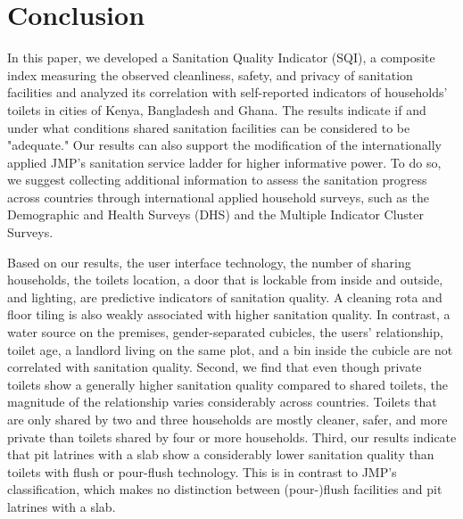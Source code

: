 \documentclass[natbib]{svjour3}                     %
\begin{document}
\FloatBarrier

\section{Conclusion}
\label{sec:conclusion}
In this paper, we developed a Sanitation Quality Indicator (SQI), a composite index measuring the observed cleanliness, safety, and privacy of sanitation facilities and analyzed its correlation with self-reported indicators of households’ toilets in cities of Kenya, Bangladesh and Ghana. The results indicate if and under what conditions shared sanitation facilities can be considered to be "adequate." Our results can also support the modification of the internationally applied JMP's sanitation service ladder for higher informative power. To do so, we suggest collecting additional information to assess the sanitation progress across countries through international applied household surveys, such as the Demographic and Health Surveys (DHS) and the Multiple Indicator Cluster Surveys.

Based on our results, the user interface technology, the number of sharing households, the toilets location, a door that is lockable from inside and outside, and lighting, are predictive indicators of sanitation quality. A cleaning rota and floor tiling is also weakly associated with higher sanitation quality. In contrast, a water source on the premises, gender-separated cubicles, the users' relationship, toilet age, a landlord living on the same plot, and a bin inside the cubicle are not correlated with sanitation quality. Second, we find that even though private toilets show a generally higher sanitation quality compared to shared toilets, the magnitude of the relationship varies considerably across countries. Toilets that are only shared by two and three households are mostly cleaner, safer, and more private than toilets shared by four or more households. Third, our results indicate that pit latrines with a slab show a considerably lower sanitation quality than toilets with flush or pour-flush technology. This is in contrast to JMP's classification, which makes no distinction between (pour-)flush facilities and pit latrines with a slab.
\end{document}
